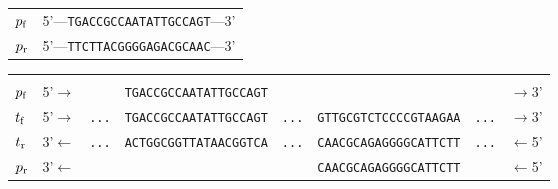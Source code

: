 \begin{center}
  \begin{tabular}{cc}
    $p_{\rm f}$ & 5'---\texttt{TGACCGCCAATATTGCCAGT}---3'\\
    $p_{\rm r}$ & 5'---\texttt{TTCTTACGGGGAGACGCAAC}---3'\\
  \end{tabular}
\end{center}
\begin{center}
  \begin{tabular}{lccccccc}
    \hline\\
    $p_{\rm f}$ & 
    5'$\rightarrow$ & &
    \texttt{TGACCGCCAATATTGCCAGT} &&&&
    $\rightarrow$3'
    \\
    $t_{\rm f}$ &
    5'$\rightarrow$ &
    \texttt{...} &
    \texttt{TGACCGCCAATATTGCCAGT} &
    \texttt{...} &
    \texttt{GTTGCGTCTCCCCGTAAGAA} &
    \texttt{...} &
    $\rightarrow$3'
    \\
    $t_{\rm r}$ &
    3'$\leftarrow$ &
    \texttt{...} &
    \texttt{ACTGGCGGTTATAACGGTCA} &
    \texttt{...} &
    \texttt{CAACGCAGAGGGGCATTCTT} &
    \texttt{...} &
    $\leftarrow$5'
    \\
    $p_{\rm r}$ &
    3'$\leftarrow$ & & & &
    \texttt{CAACGCAGAGGGGCATTCTT} &&
    $\leftarrow$5'
  \end{tabular}
\end{center}
